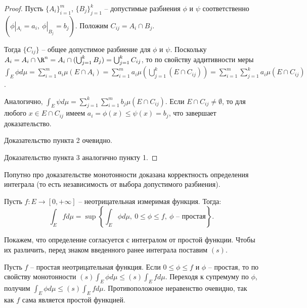 \begin{proof}
    Пусть $\{A_{i}\}_{i = 1}^{m}$, $\{B_{j}\}_{j = 1}^{k}$ -- допустимые разбиения $\phi$ и $\psi$ соответственно $(\phi|_{A_{i}} = a_{i}, \ \phi|_{B_{j}} = b_{j})$. Положим $C_{ij} = A_{i} \cap B_{j}$.

    Тогда $\{C_{ij}\}$ -- общее допустимое разбиение для $\phi$ и $\psi$. Поскольку $A_{i} = A_{i} \cap \R^{n} = A_{i} \cap (\bigcup_{j = 1}^{k}B_{j}) = \bigcup_{j = 1}^{k}C_{ij}$, то по свойству аддитивности меры $\int_{E}\phi d\mu = \sum_{i = 1}^{m}a_{i} \mu(E \cap A_{i}) = \sum_{i = 1}^{m}a_{i}\mu(\bigcup_{j = 1}^{k}(E \cap C_{ij})) = \sum_{i = 1}^{m}\sum_{j = 1}^{k}a_{i}\mu(E \cap C_{ij})$.

    Аналогично, $\int_{E} \psi d\mu = \sum_{j = 1}^{k}\sum_{i = 1}^{m}b_{j}\mu(E \cap C_{ij})$. Если $E \cap C_{ij} \neq \emptyset$, то для любого $x \in E \cap C_{ij}$ имеем $a_{i} = \phi(x) \leq \psi(x) = b_{j}$, что завершает доказательство.

    Доказательство пункта 2 очевидно.

    Доказательство пункта 3 аналогично пункту 1.
\end{proof}

\begin{note}
    Попутно про доказательстве монотонности доказана корректность определения интеграла (то есть независимость от выбора допустимого разбиения).
\end{note}

\begin{definition}
    Пусть $f: E \to [0, +\infty]$ -- неотрицательная измеримая функция. Тогда:
    \[\int_{E} f d\mu = \sup\left\{\int_{E}\phi d\mu, \ 0 \leq \phi \leq f, \ \phi \text{ -- простая}\right\}.\]
\end{definition}

\begin{note}
    Покажем, что определение согласуется с интегралом от простой функции. Чтобы их различить, перед знаком введенного ранее интеграла поставим $(s)$.

    Пусть $f$ -- простая неотрицательная функция. Если $0 \leq \phi \leq f$ и $\phi$ -- простая, то по свойству монотонности $(s)\int_{E} \phi d\mu \leq (s) \int_{E} f d\mu$. Переходя к супремуму по $\phi$, получим $\int_{E} \phi d\mu \leq (s) \int_{E} f d\mu$. Противоположное неравенство очевидно, так как $f$ сама является простой функцией.
\end{note}